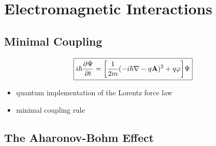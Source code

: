 \section{Electromagnetic Interactions}
\subsection{Minimal Coupling}

\[\boxed{i\hbar\pdv{\Psi}{t} = \qty[\frac{1}{2m}(-i\hbar\nabla-q\mathbf{A})^2+q\varphi]\Psi}\]
\begin{itemize}
       \item quantum implementation of the Lorentz force law
       \item minimal coupling rule
\end{itemize}
\subsection{The Aharonov-Bohm Effect}
